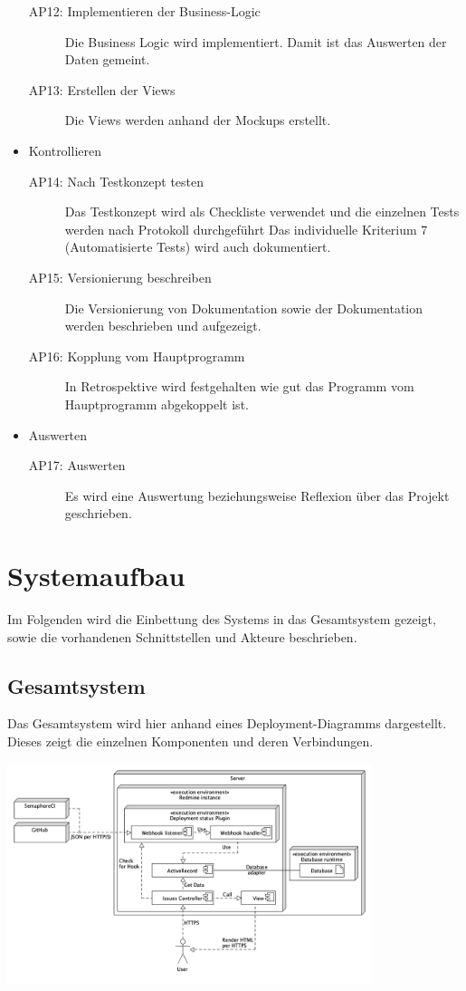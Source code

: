 \begin{itemize}
\begin{description}
        \item[AP12: Implementieren der Business-Logic] Die Business Logic wird implementiert. Damit ist das Auswerten der Daten gemeint.
        \item[AP13: Erstellen der Views] Die Views werden anhand der Mockups erstellt.
    \end{description}
    \item Kontrollieren
    \begin{description}
        \item[AP14: Nach Testkonzept testen] Das Testkonzept wird als Checkliste verwendet und die einzelnen Tests werden nach Protokoll durchgeführt \newline
        Das individuelle Kriterium 7 (Automatisierte Tests) wird auch dokumentiert.
        \item[AP15: Versionierung beschreiben] Die Versionierung von Dokumentation sowie der Dokumentation
        werden beschrieben und aufgezeigt.
        \item[AP16: Kopplung vom Hauptprogramm] In Retrospektive wird festgehalten wie gut das Programm vom Hauptprogramm abgekoppelt ist.
    \end{description}
    \item Auswerten
    \begin{description}
        \item[AP17: Auswerten] Es wird eine Auswertung beziehungsweise Reflexion über das Projekt geschrieben.
    \end{description}
\end{itemize}

\section{Systemaufbau}
Im Folgenden wird die Einbettung des Systems in das Gesamtsystem gezeigt, sowie die vorhandenen Schnittstellen und Akteure beschrieben.

\subsection{Gesamtsystem}
Das Gesamtsystem wird hier anhand eines Deployment-Diagramms dargestellt. Dieses zeigt die einzelnen Komponenten und deren Verbindungen.
\begin{center}
    \includegraphics[width=0.8\textwidth]{images/deployment/standard.png}
    \label{fig:deployment-diagram}
\end{center}


